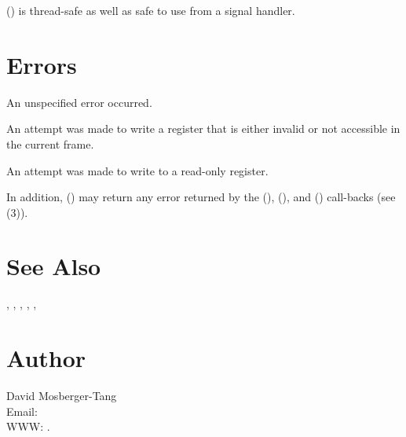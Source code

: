 \documentclass{article}
\begin{document}
() is thread-safe as well as safe to use
from a signal handler.

\section{Errors}

\begin{Description}
\item[\Const{UNW\_EUNSPEC}] An unspecified error occurred.
\item[\Const{UNW\_EBADREG}] An attempt was made to write a register
  that is either invalid or not accessible in the current frame.
\item[\Const{UNW\_EREADONLY}] An attempt was made to write to a
  read-only register.
\end{Description}
In addition, () may return any error returned by
the (), (), and
() call-backs (see
(3)).

\section{See Also}

,
,
,
,
,

\section{Author}

\noindent
David Mosberger-Tang\\
Email: \\
WWW: .
\LatexManEnd
\end{document}
